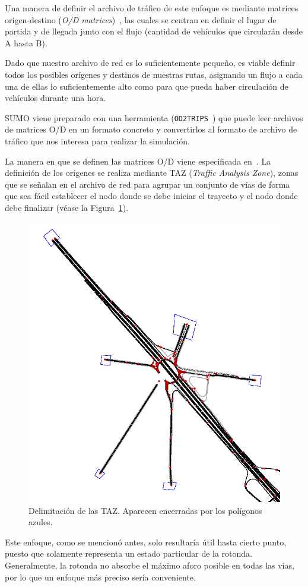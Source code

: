 Una manera de definir el archivo de tráfico de este enfoque es mediante matrices origen-destino (\textit{O/D matrices})~\cite{otto_anker_nielsen_two_1998}, las cuales se centran en definir el lugar de partida y de llegada junto con el flujo (cantidad de vehículos que circularán desde A hasta B).

Dado que nuestro archivo de red es lo suficientemente pequeño, es viable definir todos los posibles orígenes y destinos de nuestras rutas, asignando un flujo a cada una de ellas lo suficientemente alto como para que pueda haber circulación de vehículos durante una hora.

SUMO viene preparado con una herramienta (\texttt{OD2TRIPS}~\cite{noauthor_od2trips_nodate}) que puede leer archivos de matrices O/D en un formato concreto y convertirlos al formato de archivo de tráfico que nos interesa para realizar la simulación.

La manera en que se definen las matrices O/D viene especificada en~\cite{noauthor_demandimporting_nodate}. La definición de los orígenes se realiza mediante TAZ (\textit{Traffic Analysis Zone}), zonas que se señalan en el archivo de red para agrupar un conjunto de vías de forma que sea fácil establecer el nodo donde se debe iniciar el trayecto y el nodo donde debe finalizar (véase la Figura~\ref{fig:taz}).

\begin{figure}[h]
    \centering
    \includegraphics[width=0.5\linewidth]{report/images/taz.png}
    \caption[Delimitación de las TAZ]{Delimitación de las TAZ. Aparecen encerradas por los polígonos azules.}
    \label{fig:taz}
\end{figure}

Este enfoque, como se mencionó antes, solo resultaría útil hasta cierto punto, puesto que solamente representa un estado particular de la rotonda. Generalmente, la rotonda no absorbe el máximo aforo posible en todas las vías, por lo que un enfoque más preciso sería conveniente.

